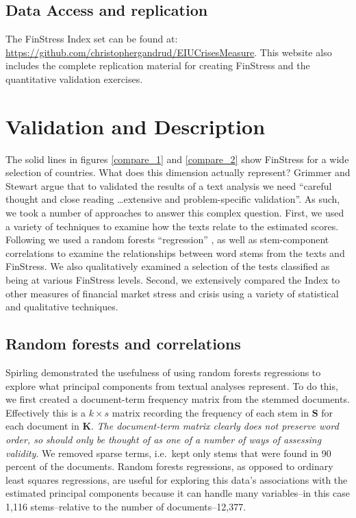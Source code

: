 \documentclass[]{article}
\begin{document}
\subsection{Data Access and replication}

The FinStress Index set can be found at:
\url{https://github.com/christophergandrud/EIUCrisesMeasure}. This website also includes the complete replication material for creating FinStress and the quantitative validation exercises.

\section{Validation and Description}\label{results}

The solid lines in figures \ref{compare_1} and \ref{compare_2} show FinStress for a wide selection of countries. What does this dimension actually represent? Grimmer and Stewart \citeyearpar[267]{Grimmer2013} argue that to validated the results of a text analysis we need ``careful thought and close reading \ldots extensive and problem-specific validation''. As such, we took a number of approaches to answer this complex question. First, we used a variety of techniques to examine how the texts relate to the estimated scores. Following \cite{Spirling2012} we used a random forests ``regression'' \citep{Breiman2001,jones2015}, as well as stem-component correlations to examine the relationships between word stems from the texts and FinStress. We also qualitatively examined a selection of the tests classified as being at various FinStress levels. Second, we extensively compared the Index to other measures of financial market stress and crisis using a variety of statistical and qualitative techniques.

\subsection{Random forests and correlations}\label{random-forests}

Spirling \citeyearpar[88-90]{Spirling2012} demonstrated the usefulness of using random forests regressions to explore what principal components from textual analyses represent. To do this, we first created a document-term frequency matrix from the stemmed documents. Effectively this is a \(k \times s\) matrix recording the frequency of each stem in \(\bm{S}\) for each document in \(\bm{K}\). \emph{The document-term matrix clearly does not preserve word order, so should only be thought of as one of a number of ways of assessing validity}. We removed sparse terms, i.e.~kept only stems that were found in 90 percent of the documents. Random forests regressions, as opposed to ordinary least squares regressions, are useful for exploring this data's associations with the estimated principal components because it can handle many variables--in this case 1,116 stems--relative to the number of documents--12,377.
\end{document}
